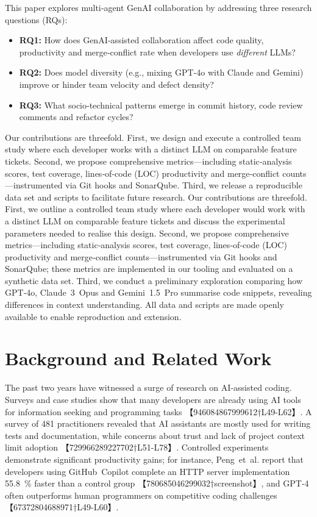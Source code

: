 \documentclass[conference]{IEEEtran}
\begin{document}
This paper explores multi‑agent GenAI collaboration by addressing three research questions (RQs):
\begin{itemize}
  \item \textbf{RQ1:} How does GenAI‑assisted collaboration affect code quality, productivity and merge‑conflict rate when developers use \emph{different} LLMs?
  \item \textbf{RQ2:} Does model diversity (e.g., mixing GPT‑4o with Claude and Gemini) improve or hinder team velocity and defect density?
  \item \textbf{RQ3:} What socio‑technical patterns emerge in commit history, code review comments and refactor cycles?
\end{itemize}

Our contributions are threefold.  First, we design and execute a controlled team study where each developer works with a distinct LLM on comparable feature tickets.  Second, we propose comprehensive metrics—including static‑analysis scores, test coverage, lines‑of‑code (LOC) productivity and merge‑conflict counts—instrumented via Git hooks and SonarQube.  Third, we release a reproducible data set and scripts to facilitate future research.
Our contributions are threefold.  First, we outline a controlled team study where each developer would work with a distinct LLM on comparable feature tickets and discuss the experimental parameters needed to realise this design.  Second, we propose comprehensive metrics—including static‑analysis scores, test coverage, lines‑of‑code (LOC) productivity and merge‑conflict counts—instrumented via Git hooks and SonarQube; these metrics are implemented in our tooling and evaluated on a synthetic data set.  Third, we conduct a preliminary exploration comparing how GPT‑4o, Claude 3 Opus and Gemini 1.5 Pro summarise code snippets, revealing differences in context understanding.  All data and scripts are made openly available to enable reproduction and extension.

\section{Background and Related Work}
The past two years have witnessed a surge of research on AI‑assisted coding.  Surveys and case studies show that many developers are already using AI tools for information seeking and programming tasks 【946084867999612†L49-L62】.  A survey of 481 practitioners revealed that AI assistants are mostly used for writing tests and documentation, while concerns about trust and lack of project context limit adoption 【729966289227702†L51-L78】.  Controlled experiments demonstrate significant productivity gains; for instance, Peng et al. report that developers using GitHub Copilot complete an HTTP server implementation 55.8 \% faster than a control group 【780685046299032†screenshot】, and GPT‑4 often outperforms human programmers on competitive coding challenges 【67372804688971†L49-L60】.
\end{document}
